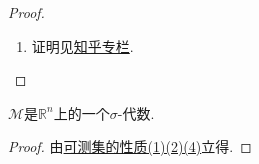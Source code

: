 \documentclass[../../main.tex]{subfiles}%
\begin{document}
\begin{proof}
\begin{enumerate}[(1)]
\item 证明见\href{https://zhuanlan.zhihu.com/p/365546947#:~:text=%E5%AE%9A%E7%90%864.1%20%EF%BC%88%E5%8F%AF%E6%B5%8B%E9%9B%86%E7%9A%84%E7%9B%B4%E7%A7%AF%E4%BB%8D%E7%84%B6%E5%8F%AF%E6%B5%8B%EF%BC%8C%E5%B9%B6%E4%B8%94%E7%9B%B4%E7%A7%AF%E7%9A%84%E6%B5%8B%E5%BA%A6%E4%B8%BA%E6%B5%8B%E5%BA%A6%E7%9A%84%E4%B9%98%E7%A7%AF%EF%BC%89%20%E5%A6%82%E6%9E%9C%20A%20%E5%92%8C%20B%20%E5%88%86%E5%88%AB%E4%B8%BA%20p,%28A%29%20cdot%20m%20%28B%29%5C%20%E8%AF%81%E6%98%8E%E6%8C%89%E7%85%A7%E4%BB%A5%E4%B8%8B%E7%89%B9%E6%AE%8A%E5%88%B0%E4%B8%80%E8%88%AC%E7%9A%84%E8%BF%87%E7%A8%8B%E3%80%82%20%E6%96%B9%E4%BD%93%EF%BC%9A%E6%96%B9%E4%BD%93%E7%9A%84%E7%9B%B4%E7%A7%AF%E4%BB%8D%E7%84%B6%E6%98%AF%E6%96%B9%E4%BD%93%EF%BC%8C%E6%89%80%E4%BB%A5%E5%8F%AF%E6%B5%8B%E3%80%82%20%E5%85%B6%E6%B5%8B%E5%BA%A6%E5%B0%B1%E6%98%AF%E5%8E%9F%E6%9D%A5%E4%B8%A4%E4%B8%AA%E6%96%B9%E4%BD%93%E7%9A%84%E4%B9%98%E7%A7%AF%E3%80%82%20%E6%A0%B9%E6%8D%AE%E6%B5%8B%E5%BA%A6%E7%9A%84%E5%8F%AF%E5%8A%A0%E6%80%A7%E5%BE%97%E5%88%B0%E7%9B%B4%E7%A7%AF%E7%9A%84%E6%B5%8B%E5%BA%A6%E7%AD%89%E4%BA%8E%E6%B5%8B%E5%BA%A6%E7%9A%84%E4%B9%98%E7%A7%AF%E3%80%82}{知乎专栏}.
\end{enumerate} 
\end{proof}

\begin{corollary}\label{corollary:可测集类是sigma-代数}
$\mathscr{M}$是$\mathbb{R}^n$上的一个$\sigma$-代数.
\end{corollary}
\begin{proof}
由\hyperref[theorem:可测集的性质]{可测集的性质(1)(2)(4)}立得.
\end{proof}
\end{document}
